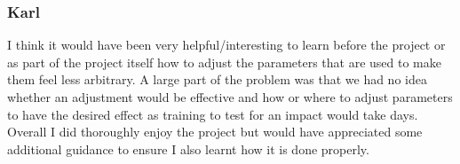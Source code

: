 \subsubsection{Karl}
I think it would have been very helpful/interesting to learn before the project or as part of the project itself how to adjust the parameters that are used to make them feel less arbitrary. A large part of the problem was that we had no idea whether an adjustment would be effective and how or where to adjust parameters to have the desired effect as training to test for an impact would take days. Overall I did thoroughly enjoy the project but would have appreciated some additional guidance to ensure I also learnt how it is done properly.